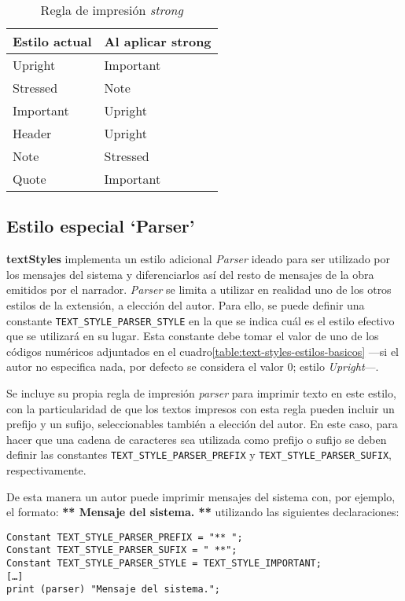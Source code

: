 \documentclass[a4paper,12pt]{article}
\numberwithin{equation}{section}
\begin{document}
\begin{table}[]
\centering
\begin{tabular}{ll}
\hline
\textbf{Estilo actual}	& \textbf{Al aplicar strong} \\ \hline
Upright					& Important						\\
Stressed				& Note							\\
Important				& Upright						\\
Header					& Upright						\\
Note					& Stressed						\\
Quote					& Important						\\ \hline
\end{tabular}
\caption{Regla de impresión \emph{strong}}
\label{table:regla-impresion-strong}
\end{table}

\subsection{Estilo especial `Parser'} \label{sec:estilo-parser}

\textbf{textStyles} implementa un estilo adicional \emph{Parser} ideado para ser utilizado por los mensajes del sistema y diferenciarlos así del resto de mensajes de la obra emitidos por el narrador. \emph{Parser} se limita a utilizar en realidad uno de los otros estilos de la extensión, a elección del autor. Para ello, se puede definir una constante \verb|TEXT_STYLE_PARSER_STYLE| en la que se indica cuál es el estilo efectivo que se utilizará en su lugar. Esta constante debe tomar el valor de uno de los códigos numéricos adjuntados en el cuadro\ref{table:text-styles-estilos-basicos} ---si el autor no especifica nada, por defecto se considera el valor $0$;  estilo \emph{Upright}---.

Se incluye su propia regla de impresión \emph{parser} para imprimir texto en este estilo, con la particularidad de que los textos impresos con esta regla pueden incluir un prefijo y un sufijo, seleccionables también a elección del autor. En este caso, para hacer que una cadena de caracteres sea utilizada como prefijo o sufijo se deben definir las constantes \verb|TEXT_STYLE_PARSER_PREFIX| y \verb|TEXT_STYLE_PARSER_SUFIX|, respectivamente.

De esta manera un autor puede imprimir mensajes del sistema con, por ejemplo, el formato: \textbf{** Mensaje del sistema. **} utilizando las siguientes declaraciones:

\begin{verbatim}
Constant TEXT_STYLE_PARSER_PREFIX = "** ";
Constant TEXT_STYLE_PARSER_SUFIX = " **";
Constant TEXT_STYLE_PARSER_STYLE = TEXT_STYLE_IMPORTANT;
[…]
print (parser) "Mensaje del sistema.";
\end{verbatim}
\end{document}
